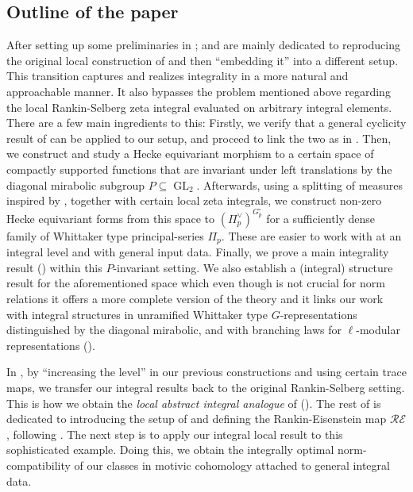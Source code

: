 \documentclass{amsart}%
\theoremstyle{plain}
\theoremstyle{plain}
\theoremstyle{remark}
\DeclareMathOperator{\GL}{GL}
\begin{document}
\subsection{Outline of the paper}
After setting up some preliminaries in ;  and  are mainly dedicated to reproducing the original local construction of \cite{Loeffler_2021} and then ``embedding it'' into a different setup. This transition captures and realizes integrality in a more natural and approachable manner. It also bypasses the problem mentioned above regarding the local Rankin-Selberg zeta integral evaluated on arbitrary integral elements. There are a few main ingredients to this: Firstly, we verify that a general cyclicity result of \cite{Sakellaridis_2008} can be applied to our setup, and proceed to link the two as in \cite{Loeffler_2021}. Then, we construct and study a Hecke equivariant morphism to a certain space of compactly supported functions that are invariant under left translations by the diagonal mirabolic subgroup $P\subseteq\GL_2$. Afterwards, using a splitting of measures inspired by \cite{kurinczuk2017rankin}, together with certain local zeta integrals, we construct non-zero Hecke equivariant forms from this space to $(\Pi_p^\vee)^{G_p^\circ}$ for a sufficiently dense family of Whittaker type principal-series $\Pi_p$. These are easier to work with at an integral level and with general input data. Finally, we prove a main integrality result () within this $P$-invariant setting. We also establish a (integral) structure result for the aforementioned space which even though is not crucial for norm relations it offers a more complete version of the theory and it links our work with integral structures in unramified Whittaker type $G$-representations distinguished by the diagonal mirabolic, and with branching laws for $\ell$-modular representations ().

In , by ``increasing the level'' in our previous constructions and using certain trace maps, we transfer our integral results back to the original Rankin-Selberg setting. This is how we obtain the \textit{local abstract integral analogue} of  (). The rest of  is dedicated to introducing the setup of  and defining the Rankin-Eisenstein map $\mathcal{RE}$, following \cite{Loeffler_2021}. The next step is to apply our integral local result to this sophisticated example. Doing this, we obtain the integrally optimal norm-compatibility of our classes in motivic cohomology attached to general integral data. 
\end{document}
